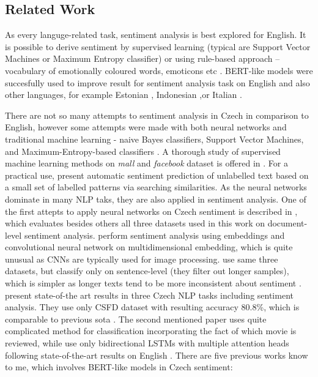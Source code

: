 \subsection{Related Work}
As every languge-related task, sentiment analysis is best explored for English. It is possible to derive sentiment by supervised learning (typical are Support Vector Machines or Maximum Entropy classifier) or using rule-based approach -- vocabulary of emotionally coloured words, emoticons etc \citep{Cano2019, Veselovska}. BERT-like models were succesfully used to improve result for sentiment analysis task on English \citep{Devlin2019} and also other languages, for example Estonian \citep{Kittask2020}, Indonesian \citep{putra} ,or Italian \citep{pota2021effective}.
\par
There are not so many attempts to sentiment analysis in Czech in comparison to English, however some attempts were made with both neural networks and traditional machine learning - naive Bayes classifiers, Support Vector Machines, and Maximum-Entropy-based classifiers \citep{Veselovska}.  A thorough study of supervised machine learning methods on \textit{mall} and \textit{facebook} dataset is offered in \citet{Cano2019}. For a practical use, \citet{Zizka} present automatic sentiment prediction of unlabelled text based on a small set of labelled patterns via searching similarities. As the neural networks dominate in many NLP taks, they are also applied in sentiment analysis. One of the first attepts to apply neural networks on Czech sentiment is described in \citet{Lenc}, which evaluates besides others all three datasets used in this work on document-level sentiment analysis. \citet{kysely} perform sentiment analysis using embeddings and convolutional neural network on multidimensional embedding, which is quite unusual as CNNs are typically used for image processing. \citet{kysely} use same three datasets, but classify only on sentence-level (they filter out longer samples), which is simpler as longer texts tend to be more inconsistent about sentiment \citep{Veselovska}. \citet{Libovicky} present state-of-the art results in three Czech NLP tasks including sentiment analysis. They use only CSFD dataset with resulting accuracy 80.8\%, which is comparable to previous \acrshort{sota} \citep{Brychcin2013}. The second mentioned paper uses quite complicated method for classification incorporating the fact of which movie is reviewed, while \citet{Libovicky} use only bidirectional LSTMs with multiple attention heads following state-of-the-art results on English \citep{Lin2017}. There are five previous works know to me, which involves BERT-like models in Czech sentiment: 
